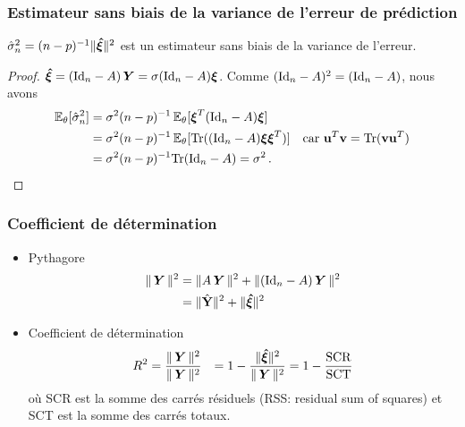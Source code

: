 \begin{frame}
\frametitle{Estimateur sans biais de la variance de l'erreur de prédiction}
\begin{theo}
$\hat{\sigma}_n^2= (n-p)^{-1} \| \boldsymbol{\hat{\xi}} \|^2$ est un estimateur sans biais de la variance de l'erreur.
\end{theo}
\begin{proof}
\alert{$\boldsymbol{\hat{\xi}}= (\mathrm{Id}_{n} - A) \operatorname{\boldsymbol{Y}}= \sigma (\mathrm{Id}_{n} - A) \boldsymbol{\xi}$}. Comme $(\mathrm{Id}_{n}-A)^2= (\mathrm{Id}_{n}-A)$, nous avons
\begin{align*}
\operatorname{{\mathbb E}}_{\theta}[\hat{\sigma}_n^2] &= \sigma^2 (n-p)^{-1} \operatorname{{\mathbb E}}_{\theta}[ \boldsymbol{\xi}^T (\mathrm{Id}_{n}-A) \boldsymbol{\xi}] \\
                             &= \sigma^2 (n-p)^{-1} \operatorname{{\mathbb E}}_{\theta}[ \mathrm{Tr}( (\mathrm{Id}_{n}-A) \boldsymbol{\xi} \boldsymbol{\xi}^T) ]  \quad \text{car $\mathbf{u}^T \mathbf{v}= \mathrm{Tr}(\mathbf{v} \mathbf{u}^T)$}\\
                             &= \sigma^2 (n-p)^{-1} \mathrm{Tr}(\mathrm{Id}_{n}-A)= \sigma^2 \,.
\end{align*}
\end{proof}
\end{frame}

\begin{frame}
\frametitle{Coefficient de détermination}
\begin{itemize}
\item \alert{Pythagore}
\begin{align*}
\| \operatorname{\boldsymbol{Y}} \|^2 &= \| A \operatorname{\boldsymbol{Y}} \|^2 + \| (\mathrm{Id}_{n} - A) \operatorname{\boldsymbol{Y}} \|^2 \\
            &= \| \hat{\mathbf{Y}} \|^2 + \| \boldsymbol{\hat{\xi}} \|^2
\end{align*}
\item \alert{Coefficient de détermination}
\begin{align*}
R^2 &= \frac{\|\operatorname{\boldsymbol{Y}}\|^2}{\|\operatorname{\boldsymbol{Y}}\|^2}
    &= 1 - \frac{\| \boldsymbol{\hat{\xi}} \|^2}{\|\operatorname{\boldsymbol{Y}}\|^2} = 1 - \frac{\mathrm{SCR}}{\mathrm{SCT}}
\end{align*}
où \alert{SCR} est la somme des carrés résiduels (RSS: residual sum of squares) et \alert{SCT} est la somme des carrés totaux.
\end{itemize}
\end{frame}





